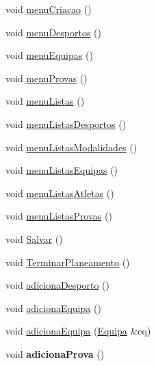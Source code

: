 \begin{DoxyCompactItemize}
\item 
void \hyperlink{class_campeonato_a2d0f16fb58b98955694ef81a8c425e33}{menu\+Criacao} ()
\item 
void \hyperlink{class_campeonato_adf6bff95b5da944f19ff3b742b9bea7f}{menu\+Desportos} ()
\item 
void \hyperlink{class_campeonato_a638255f1c4398a613f89b957996161a2}{menu\+Equipas} ()
\item 
void \hyperlink{class_campeonato_a2060389b6b7c0a5d0e97eb5518e9baac}{menu\+Provas} ()
\item 
void \hyperlink{class_campeonato_a890b5a7ed78faf99bc1c9efa7c271209}{menu\+Listas} ()
\item 
void \hyperlink{class_campeonato_aee59b9e94def8066f779fe5da6d2d753}{menu\+Listas\+Desportos} ()
\item 
void \hyperlink{class_campeonato_a9d1f4d2fb847a8859ad75493395198fa}{menu\+Listas\+Modalidades} ()
\item 
void \hyperlink{class_campeonato_aac66996a554cbfe115d5098562676a88}{menu\+Listas\+Equipas} ()
\item 
void \hyperlink{class_campeonato_a61b565e9686153e9f06c3f0583fc4371}{menu\+Listas\+Atletas} ()
\item 
void \hyperlink{class_campeonato_a1a6623de7af07dddf02379e4d0ed85cc}{menu\+Listas\+Provas} ()
\item 
void \hyperlink{class_campeonato_a136f541594756136f2007a1ab7e5e741}{Salvar} ()
\item 
void \hyperlink{class_campeonato_aa8aad250006e4d16951adeb54f0121e2}{Terminar\+Planeamento} ()
\item 
void \hyperlink{class_campeonato_a943851dc30b9ee8afc0014d430f8d800}{adiciona\+Desporto} ()
\item 
void \hyperlink{class_campeonato_a61f99e0dac86a67b21facebdc6a6d6a1}{adiciona\+Equipa} ()
\item 
void \hyperlink{class_campeonato_ab74b424025f1dca24fdd3036a23df615}{adiciona\+Equipa} (\hyperlink{class_equipa}{Equipa} \&eq)
\item 
\hypertarget{class_campeonato_a23beadb789cf823d9fe105a235ddebda}{}void {\bfseries adiciona\+Prova} ()\label{class_campeonato_a23beadb789cf823d9fe105a235ddebda}


\end{DoxyCompactItemize}
